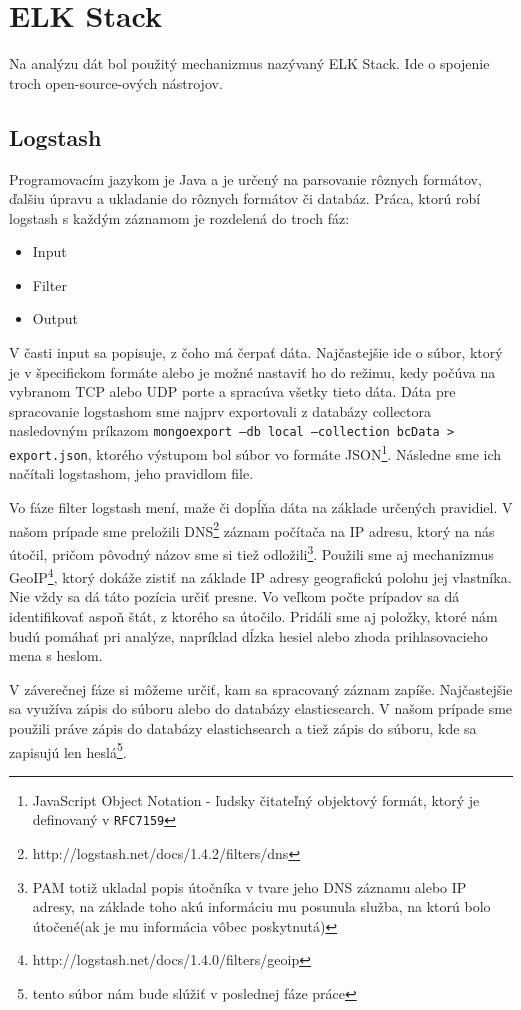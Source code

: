 \documentclass[12pt, oneside]{book}
\begin{document}
\section{ELK Stack}
Na analýzu dát bol použitý mechanizmus nazývaný ELK Stack.
Ide o spojenie troch open-source-ových nástrojov. 
\subsection{Logstash}
Programovacím jazykom je Java a je určený na parsovanie rôznych formátov, ďalšiu úpravu a ukladanie do rôznych formátov či databáz. Práca, ktorú robí logstash s každým záznamom je rozdelená do troch fáz:
\begin{itemize}
\item Input
\item Filter
\item Output
\end{itemize}

V časti input sa popisuje, z čoho má čerpať dáta. Najčastejšie ide o súbor, ktorý je v špecifickom formáte alebo je možné nastaviť ho do režimu, kedy počúva na vybranom TCP alebo UDP porte a spracúva všetky tieto dáta. Dáta pre spracovanie logstashom sme najprv exportovali z databázy collectora nasledovným príkazom \texttt{mongoexport --db local --collection bcData > export.json}, ktorého výstupom bol súbor vo formáte JSON\footnote{JavaScript Object Notation - ľudsky čitateľný objektový formát, ktorý je definovaný v \texttt{RFC7159}}.
Následne sme ich načítali logstashom, jeho pravidlom file.

Vo fáze filter logstash mení, maže či dopĺňa dáta na základe určených pravidiel.
V našom prípade sme preložili DNS\footnote{http://logstash.net/docs/1.4.2/filters/dns} záznam počítača na IP adresu, ktorý na nás útočil, pričom pôvodný názov sme si tiež odložili\footnote{PAM totiž ukladal popis útočníka v tvare jeho DNS záznamu alebo IP adresy, na základe toho akú informáciu mu posunula služba, na ktorú bolo útočené(ak je mu informácia vôbec poskytnutá)}.
Použili sme aj mechanizmus GeoIP\footnote{http://logstash.net/docs/1.4.0/filters/geoip}, ktorý dokáže zistiť na základe IP adresy geografickú polohu jej vlastníka.
Nie vždy sa dá táto pozícia určiť presne.
Vo veľkom počte prípadov sa dá identifikovať aspoň štát, z ktorého sa útočilo.
Pridáli sme aj položky, ktoré nám budú pomáhať pri analýze, napríklad dĺzka hesiel alebo zhoda prihlasovacieho mena s heslom.

V záverečnej fáze si môžeme určiť, kam sa spracovaný záznam zapíše.
Najčastejšie sa využíva zápis do súboru alebo do databázy elasticsearch. 
V našom prípade sme použili práve zápis do databázy elastichsearch a tiež zápis do súboru, kde sa zapisujú len heslá\footnote{tento súbor nám bude slúžiť v poslednej fáze práce}.
\end{document}
